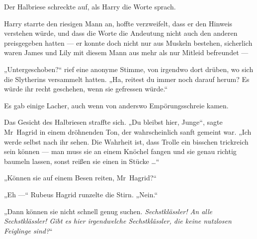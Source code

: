 Der Halbriese schreckte auf, als Harry die Worte sprach.

Harry starrte den riesigen Mann an, hoffte verzweifelt, dass er den Hinweis verstehen würde, und dass die Worte die Andeutung nicht auch den anderen preisgegeben hatten — er konnte doch nicht nur aus Muskeln bestehen, sicherlich waren James und Lily mit diesem Mann aus mehr als nur Mitleid befreundet —

„Untergeschoben?“ rief eine anonyme Stimme, von irgendwo dort drüben, wo sich die Slytherins versammelt hatten.
„Ha, reitest du immer noch darauf herum? Es würde ihr recht geschehen, wenn sie gefressen würde.“

Es gab einige Lacher, auch wenn von anderswo Empörungsschreie kamen.

Das Gesicht des Halbriesen straffte sich.
„Du bleibst hier, Junge“, sagte Mr~Hagrid in einem dröhnenden Ton, der wahrscheinlich sanft gemeint war.
„Ich werde selbst nach ihr sehen. Die Wahrheit ist, dass Trolle ein bisschen trickreich sein können — man muss sie an einem Knöchel fangen und sie genau richtig baumeln lassen, sonst reißen sie einen in Stücke …“

„Können sie auf einem Besen reiten, Mr~Hagrid?“

„Eh —“ Rubeus Hagrid runzelte die Stirn.
„Nein.“

„Dann können sie nicht schnell genug suchen. \emph{Sechstklässler! An alle Sechstklässler! Gibt es hier irgendwelche Sechstklässler, die keine nutzlosen Feiglinge sind?}“

